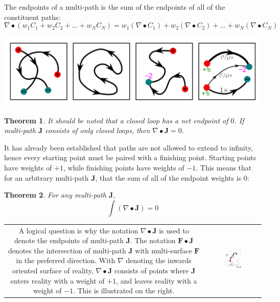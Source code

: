 \documentclass{book}
\newtheorem{thm}{Theorem}
\begin{document}
The endpoints of a multi-path is the sum of the endpoints of all of the constituent paths:
\[\nabla \bullet (w_1 C_1 + w_2 C_2 + ... + w_N C_N)
= w_1(\nabla \bullet C_1) + w_2(\nabla \bullet C_2) + ... + w_N(\nabla \bullet C_N)\]

\begin{center}
\includegraphics[width = \textwidth]{Boundaries/Path_endpoints/path_endpoint_examples_2}
\end{center}


\begin{thm}
It should be noted that a closed loop has a net endpoint of \(0\). If multi-path \(\mathbf{J}\) consists of only closed loops, then \(\nabla \bullet \mathbf{J} = 0\). 
\end{thm}

It has already been established that paths are not allowed to extend to infinity, hence every starting point must be paired with a finishing point. Starting points have weights of \(+1\), while finishing points have weights of \(-1\). This means that for an arbitrary multi-path \(\mathbf{J}\), that the sum of all of the endpoint weights is \(0\): 
\begin{thm}
For any multi-path \(\mathbf{J}\),
\[\int (\nabla \bullet \mathbf{J}) = 0\] 
\end{thm}

\begin{tabular}{cc}
\parbox{0.5\textwidth}{
A logical question is why the notation \(\nabla \bullet \mathbf{J}\) is used to denote the endpoints of multi-path \(\mathbf{J}\). The notation \(\mathbf{F} \bullet \mathbf{J}\) denotes the intersection of multi-path \(\mathbf{J}\) with multi-surface \(\mathbf{F}\) in the preferred direction. With \(\nabla\) denoting the inwards oriented surface of reality, \(\nabla \bullet \mathbf{J}\) consists of points where \(\mathbf{J}\) enters reality with a weight of \(+1\), and leaves reality with a weight of \(-1\). This is illustrated on the right.
} & \parbox{0.4\textwidth}{
\includegraphics[width = 0.4\textwidth]{Boundaries/Path_endpoints/path_surface_intersections_and_path_endpoints}
}
\end{tabular}
\end{document}
